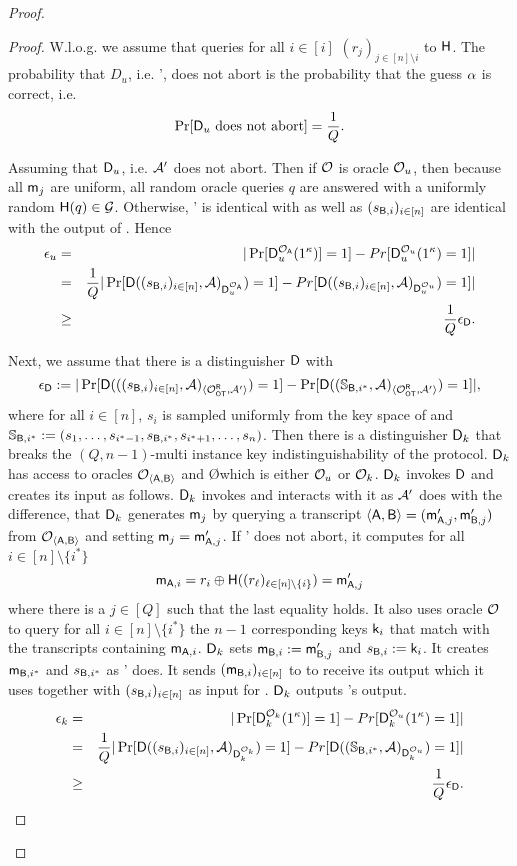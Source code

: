 \begin{proof}
\begin{proof}
W.l.o.g. we assume that \Adv queries for all $i\in[i]$ $(r_j)_{j\in[n]\setminus{i}}$ to $\mathsf{H}$. The probability that $D_u$, i.e. \Adv', does not abort is the probability that the guess $\alpha$ is correct, i.e.
$$
\Pr[\mathsf D_u\text{ does not abort}]=\frac{1}{Q}.
$$

Assuming that $\mathsf D_u$, i.e. $\mathcal{A}'$ does not abort. Then if $\mathcal{O}$ is oracle $\mathcal{O}_{u}$, then because all $\mathsf{m}_j$ are uniform, all random oracle queries $q$ are answered with a uniformly random $\mathsf{H}(q)\in\mathcal{G}$.  Otherwise, \Adv' is identical with \send as well as $(s_{\mathsf{B},i})_{i\in[n]}$ are identical with the output of \send.  
Hence 
\begin{eqnarray*}
\epsilon_{u}&=&|\Pr[\mathsf D_u^{\mathcal{O}_{\mathsf{A}}}(1^{\kappa})]=1]-Pr[\mathsf D_u^{\mathcal{O}_{u}}(1^{\kappa})=1]|\\
&= &\frac{1}{Q}|\Pr[\mathsf D((s_{\mathsf{B},i})_{i\in[n]},\mathcal{A})_{\mathsf D_u^{\mathcal{O}_{\mathsf{A}}}})=1]-Pr[\mathsf D((s_{\mathsf{B},i})_{i\in[n]},\mathcal{A})_{\mathsf D_u^{\mathcal{O}_{u}}})=1]|\\
&\geq&\frac{1}{Q}\epsilon_{\mathsf D}.
\end{eqnarray*}



Next, we assume that there is a distinguisher $\mathsf D$ with
$$
\epsilon_{\mathsf D}:=|\Pr[\mathsf D(((s_{\mathsf{B},i})_{i\in[n]},\mathcal{A})_{\langle \mathcal{O}_{\mathsf{OT}}^\mathsf{R} , \mathcal{A}' \rangle})=1] -\Pr[\mathsf D((\mathsf{\mathbb S}_{\mathsf{B},i^*}, \mathcal{A})_{\langle \mathcal{O}_{\mathsf{OT}}^\mathsf{R} , \mathcal{A}' \rangle})=1]|,
$$
where for all $i\in[n]$, $s_i$ is sampled uniformly from the key space of \UKA and $\mathsf{\mathbb S}_{\mathsf{B},i^*}:=(s_{1},\dots, s_{i^*-1},s_{\mathsf{B},i^*},s_{i^*+1},\dots, s_{n})$. Then there is a distinguisher $\mathsf D_k$ that breaks the $(Q,n-1)$-multi instance key indistinguishability of the \UKA protocol. $\mathsf D_k$ has access to oracles $\mathcal{O}_{\langle \mathsf{A},\mathsf{B}\rangle}$ and \O which is either $\mathcal{O}_u$ or $\mathcal{O}_k$. $\mathsf D_k$ invokes $\mathsf D$ and creates its input as follows. $\mathsf D_k$ invokes \Adv and interacts with it as $\mathcal{A}'$ does with the difference, that $\mathsf D_k$ generates $\mathsf{m}_j$ by querying a transcript $\langle \mathsf{A}, \mathsf{B}\rangle=(\mathsf{m}_{\mathsf{A},j}',\mathsf{m}_{\mathsf{B},j}')$ from $\mathcal{O}_{\langle \mathsf{A},\mathsf{B}\rangle}$ and setting $\mathsf{m}_j=\mathsf{m}_{\mathsf{A},j}'$. If \Adv' does not abort, it computes for all $i\in[n]\setminus\{i^*\}$
$$
\mathsf{m}_{\mathsf{A},i}=r_i\oplus\mathsf{H}((r_{\ell})_{\ell\in[n]\setminus\{i\}})=\mathsf{m}_{\mathsf{A},j}'
$$
where there is a $j\in[Q]$ such that the last equality holds. It also uses oracle $\mathcal{O}$ to query for all $i\in[n]\setminus\{i^*\}$ the $n-1$ corresponding keys $\mathsf{k}_i$ that match with the transcripts containing $\mathsf{m}_{\mathsf{A},i}$. $\mathsf D_k$ sets $\mathsf{m}_{\mathsf{B},i}:=\mathsf{m}_{\mathsf{B},j}'$ and $s_{\mathsf{B},i}:=\mathsf{k}_i$. It creates $\mathsf{m}_{\mathsf{B},i^*}$ and $s_{\mathsf{B},i^*}$ as \Adv' does. It sends $(\mathsf{m}_{\mathsf{B},i})_{i\in[n]}$ to \Adv to receive its output which it uses together with $(s_{\mathsf{B},i})_{i\in[n]}$ as input for \D. $\mathsf D_k$ outputs \D's output.  
\begin{eqnarray*}
\epsilon_{k}&=&|\Pr[\mathsf D_k^{\mathcal{O}_{k}}(1^{\kappa})]=1]-Pr[\mathsf D_k^{\mathcal{O}_{u}}(1^{\kappa})=1]|\\
&= &\frac{1}{Q}|\Pr[\mathsf D((s_{\mathsf{B},i})_{i\in[n]},\mathcal{A})_{\mathsf D_k^{\mathcal{O}_{k}}})=1]-Pr[\mathsf D((\mathsf{\mathbb S}_{\mathsf{B},i^*},\mathcal{A})_{\mathsf D_k^{\mathcal{O}_{u}}})=1]|\\
&\geq&\frac{1}{Q}\epsilon_{\mathsf D}.
\end{eqnarray*}


\end{proof}
\end{proof}
